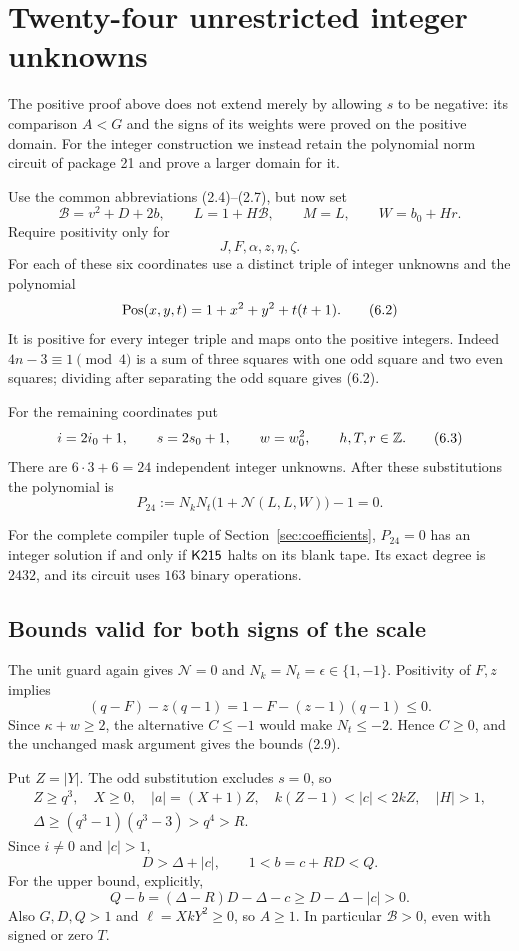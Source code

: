 \section{Twenty-four unrestricted integer unknowns}
\label{sec:integer}

The positive proof above does not extend merely by allowing \(s\)
to be negative: its comparison \(A<G\) and the signs of its weights
were proved on the positive domain. For the integer construction we
instead retain the polynomial norm circuit of package 21 and prove a
larger domain for it.

Use the common abbreviations (2.4)--(2.7), but now set
\[
\mathcal B=v^2+D+2b,\qquad
L=1+H\mathcal B,\qquad M=L,\qquad W=b_0+Hr.
\tag{6.1}
\]
Require positivity only for
\[
J,F,\alpha,z,\eta,\zeta.
\]
For each of these six coordinates use a distinct triple of integer
unknowns and the polynomial
\[
\operatorname{Pos}(x,y,t)=1+x^2+y^2+t(t+1).
\tag{6.2}
\]
It is positive for every integer triple and maps onto the positive
integers. Indeed \(4n-3\equiv1\pmod4\) is a sum of three squares
with one odd square and two even squares; dividing after separating
the odd square gives (6.2).

For the remaining coordinates put
\[
i=2i_0+1,\qquad s=2s_0+1,\qquad w=w_0^2,
\qquad h,T,r\in\mathbb Z.
\tag{6.3}
\]
There are \(6\cdot3+6=24\) independent integer unknowns.
After these substitutions the polynomial is
\[
\boxed{\quad P_{24}:=N_kN_t
 \bigl(1+\mathcal N(L,L,W)\bigr)-1=0.\quad}
\tag{6.4}
\]

\begin{theorem}\label{thm:integer}
For the complete compiler tuple of Section~\ref{sec:coefficients},
\(P_{24}=0\) has an integer solution if and only if \(\mathsf{K215}\)
halts on its blank tape. Its exact degree is \(2432\), and its
circuit uses \(163\) binary operations.
\end{theorem}

\subsection{Bounds valid for both signs of the scale}

The unit guard again gives \(\mathcal N=0\) and
\(N_k=N_t=\epsilon\in\{1,-1\}\). Positivity of \(F,z\) implies
\[
(q-F)-z(q-1)=1-F-(z-1)(q-1)\le0.
\]
Since \(\kappa+w\ge2\), the alternative \(C\le-1\) would make
\(N_t\le-2\). Hence \(C\ge0\), and the unchanged mask argument gives
the bounds (2.9).

Put \(Z=|Y|\). The odd substitution excludes \(s=0\), so
\[
\begin{gathered}
Z\ge q^3,\quad X\ge0,\quad |a|=(X+1)Z,\quad
k(Z-1)<|c|<2kZ,\quad |H|>1,\\
\Delta\ge(q^3-1)(q^3-3)>q^4>R.
\end{gathered}
\tag{6.5}
\]
Since \(i\ne0\) and \(|c|>1\),
\[
D>\Delta+|c|,\qquad
1<b=c+RD<Q.
\tag{6.6}
\]
For the upper bound, explicitly,
\[
Q-b=(\Delta-R)D-\Delta-c
 \ge D-\Delta-|c|>0.
\]
Also \(G,D,Q>1\) and
\(\ell=XkY^2\ge0\), so \(A\ge1\).
In particular \(\mathcal B>0\), even with signed or zero \(T\).

